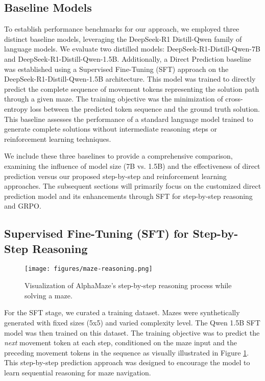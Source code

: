 \subsection{Baseline Models}
\label{subsec:baseline_model}

To establish performance benchmarks for our approach, we employed three distinct baseline models, leveraging the DeepSeek-R1 \citep{Guo2025DeepSeekR1} Distill-Qwen family of language models. We evaluate two distilled models: DeepSeek-R1-Distill-Qwen-7B and DeepSeek-R1-Distill-Qwen-1.5B. Additionally, a Direct Prediction baseline was established using a Supervised Fine-Tuning (SFT) approach on the DeepSeek-R1-Distill-Qwen-1.5B architecture. This model was trained to directly predict the complete sequence of movement tokens representing the solution path through a given maze. The training objective was the minimization of cross-entropy loss between the predicted token sequence and the ground truth solution. This baseline assesses the performance of a standard language model trained to generate complete solutions without intermediate reasoning steps or reinforcement learning techniques. 

We include these three baselines to provide a comprehensive comparison, examining the influence of model size (7B vs. 1.5B) and the effectiveness of direct prediction versus our proposed step-by-step and reinforcement learning approaches. The subsequent sections will primarily focus on the customized direct prediction model and its enhancements through SFT for step-by-step reasoning and GRPO.
\subsection{Supervised Fine-Tuning (SFT) for Step-by-Step Reasoning}
\label{subsec:sft}

\begin{figure}
    \centering
    \texttt{[image: figures/maze-reasoning.png]}
    \caption{Visualization of AlphaMaze's step-by-step reasoning process while solving a maze.}
    \label{fig:visual-reasoning}
\end{figure}

For the SFT stage, we curated a training dataset. Mazes were synthetically generated with fixed sizes (5x5) and varied complexity level. The Qwen 1.5B SFT model was then trained on this dataset. The training objective was to predict the \textit{next} movement token at each step, conditioned on the maze input and the preceding movement tokens in the sequence as visually illustrated in Figure \ref{fig:visual-reasoning}. This step-by-step prediction approach was designed to encourage the model to learn sequential reasoning for maze navigation.

